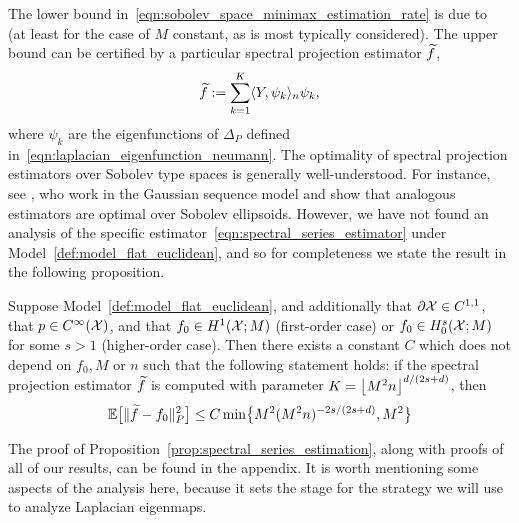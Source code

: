 The lower bound in~\eqref{eqn:sobolev_space_minimax_estimation_rate} is due to~\citep{stone1980} (at least for the case of $M$ constant, as is most typically considered). The upper bound can be certified by a particular spectral projection estimator $\widetilde{f}$,
\begin{equation}
\label{eqn:spectral_series_estimator}
\widetilde{f} := \sum_{k = 1}^{K} \langle Y, \psi_k \rangle_n \psi_k,
\end{equation}
where $\psi_k$ are the eigenfunctions of $\Delta_P$ defined in~\eqref{eqn:laplacian_eigenfunction_neumann}. The optimality of spectral projection estimators over Sobolev type spaces is generally well-understood. For instance, see \cite{tsybakov08,johnstone2011,gine16}, who work in the Gaussian sequence model and show that analogous estimators are optimal over Sobolev ellipsoids. However, we have not found an analysis of the specific estimator~\eqref{eqn:spectral_series_estimator} under Model~\ref{def:model_flat_euclidean}, and so for completeness we state the result in the following proposition.
\begin{proposition}
	\label{prop:spectral_series_estimation}
	Suppose Model~\ref{def:model_flat_euclidean}, and additionally that $\partial \mathcal{X} \in C^{1,1}$, that $p \in C^{\infty}(\mathcal{X})$, and that $f_0 \in H^1(\mathcal{X};M)$ (first-order case) or $f_0 \in H_0^s(\mathcal{X};M)$ for some $s > 1$ (higher-order case). Then there exists a constant $C$ which does not depend on $f_0,M$ or $n$ such that the following statement holds: if the spectral projection estimator $\widetilde{f}$ is computed with parameter $K = \left\lfloor M^2n \right\rfloor^{d/(2s + d)}$, then
	\begin{equation*}
	\mathbb{E}\bigl[\|\widetilde{f} - f_0\|_P^2\bigr] \leq C \min\bigl\{M^2(M^2n)^{-2s/(2s + d)}, M^2\bigr\}
	\end{equation*}
\end{proposition}
The proof of Proposition~\ref{prop:spectral_series_estimation}, along with proofs of all of our results, can be found in the appendix. It is worth mentioning some aspects of the analysis here, because it sets the stage for the strategy we will use to analyze Laplacian eigenmaps.  

